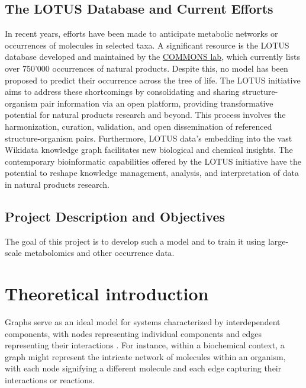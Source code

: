 \documentclass[
11pt, %
oneside, %
english, %
singlespacing, %
headsepline, %
chapterinoneline, %
]{MastersDoctoralThesis} %
\begin{document}
\section{The LOTUS Database and Current Efforts}
In recent years, efforts have been made to anticipate metabolic networks or occurrences of molecules in selected taxa. A significant resource is the LOTUS database \cite{rutzLOTUSInitiativeOpen2022} developed and maintained by the \href{https://www.unifr.ch/bio/en/groups/allard/}{COMMONS lab}, which currently lists over 750'000 occurrences of natural products. Despite this, no model has been proposed to predict their occurrence across the tree of life. The LOTUS initiative aims to address these shortcomings by consolidating and sharing structure-organism pair information via an open platform, providing transformative potential for natural products research and beyond. This process involves the harmonization, curation, validation, and open dissemination of referenced structure-organism pairs. Furthermore, LOTUS data's embedding into the vast Wikidata knowledge graph facilitates new biological and chemical insights. The contemporary bioinformatic capabilities offered by the LOTUS initiative have the potential to reshape knowledge management, analysis, and interpretation of data in natural products research.

\section{Project Description and Objectives}
The goal of this project is to develop such a model and to train it using large-scale metabolomics and other occurrence data.



\chapter{Theoretical introduction}\label{chap:Theoretical introduction}
Graphs serve as an ideal model for systems characterized by interdependent components, with nodes representing individual components and edges representing their interactions \cite{trudeauIntroductionGraphTheory1993}. For instance, within a biochemical context, a graph might represent the intricate network of molecules within an organism, with each node signifying a different molecule and each edge capturing their interactions or reactions.
\end{document}
